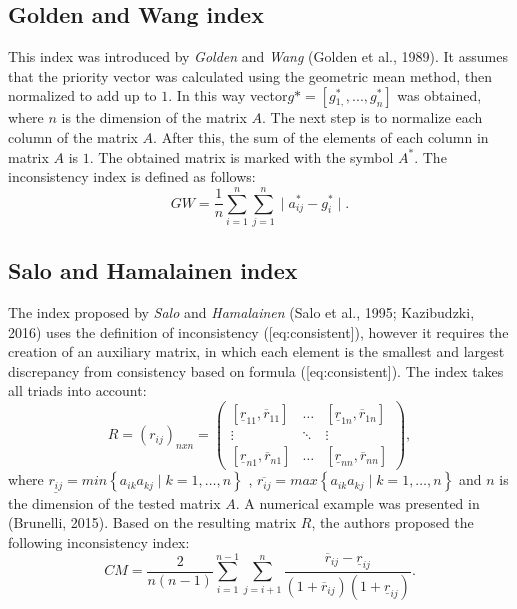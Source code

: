 \subsection{Golden and Wang index}

This index was introduced by \textit{Golden} and \textit{Wang} (Golden et al., 1989). It assumes that the priority vector was calculated using the geometric mean method, then normalized to add up to $1$. In this way vector$ g*=[g{}_{1,}^{*},...,g_{n}^{*}]$ was obtained, where $n$ is the dimension of the matrix $A$. The next step is to normalize each column of the matrix $A$. After this, the sum of the elements of each column in matrix $A$ is $1$. The obtained matrix is marked with the symbol $A^{*}$. The inconsistency index is defined as follows:
	\begin{equation} 
		GW=\frac{1}{n}\sum_{i=1}^{n}\sum_{j=1}^{n}\mid a_{ij}^{*}-g_{i}^{*}\mid.
	 \end{equation}
 

\subsection{Salo and Hamalainen index}

The index proposed by \textit{Salo} and \textit{Hamalainen} (Salo et al., 1995; Kazibudzki, 2016) uses the definition of inconsistency ([eq:consistent]), however it requires the creation of an auxiliary matrix, in which each element is the smallest and largest discrepancy from consistency based on formula ([eq:consistent]). The index takes all triads into account:
	\begin{equation} 
		R=(r_{ij})_{nxn}=\left(\begin{array}{ccc}
			[\underline{r}_{11},\overline{r}_{11}] & \ldots & [\underline{r}_{1n},\overline{r}_{1n}]\\
			\vdots & \ddots & \vdots\\{}
			[\underline{r}_{n1},\overline{r}_{n1}] & \ldots & [\underline{r}_{nn},\overline{r}_{nn}]
		\end{array}\right),
	\end{equation}
 where $\underline{r_{ij}}=min\left\{ a_{ik}a_{kj}\mid k=1,\ldots,n\right\}$ , $\overline{r_{ij}}=max\left\{ a_{ik}a_{kj}\mid k=1,\ldots,n\right\}$ and $n$ is the dimension of the tested matrix $A$. A numerical example was presented in (Brunelli, 2015). Based on the resulting matrix $R$, the authors proposed the following inconsistency index:
 	\begin{equation} 
		CM=\frac{2}{n(n-1)}\sum_{i=1}^{n-1}\sum_{j=i+1}^{n}\frac{\overline{r}_{ij}-\underline{r}_{ij}}{\left(1+\overline{r}_{ij}\right)\left(1+\underline{r}_{ij}\right)}.
	 \end{equation}
 

